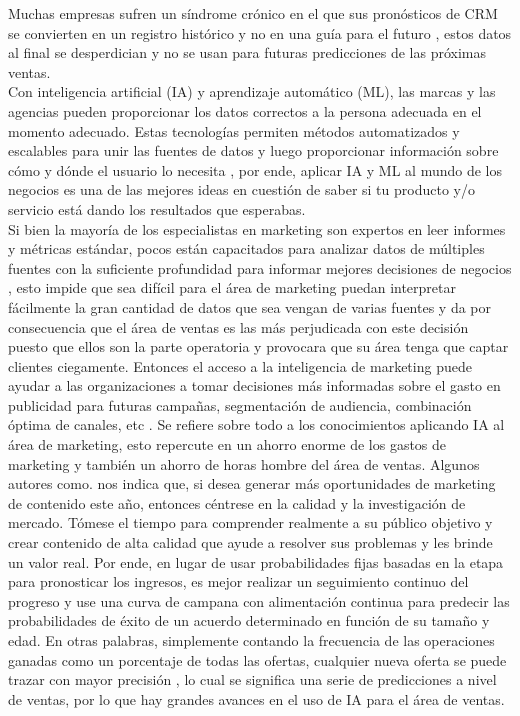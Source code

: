 \documentclass[conference]{IEEEtran}
\begin{document}
Muchas empresas sufren un síndrome crónico en el que sus pronósticos de CRM se convierten en un registro histórico y no en una guía para el futuro \cite{b16}, estos datos al final se desperdician y no se usan para futuras predicciones de las próximas ventas.\\
Con inteligencia artificial (IA) y aprendizaje automático (ML), las marcas y las agencias pueden proporcionar los datos correctos a la persona adecuada en el momento adecuado. Estas tecnologías permiten métodos automatizados y escalables para unir las fuentes de datos y luego proporcionar información sobre cómo y dónde el usuario lo necesita \cite{b17} , por ende, aplicar IA y ML al mundo de los negocios es una de las mejores ideas en cuestión de saber si tu producto y/o servicio está dando los resultados que esperabas.\\
Si bien la mayoría de los especialistas en marketing son expertos en leer informes y métricas estándar, pocos están capacitados para analizar datos de múltiples fuentes con la suficiente profundidad para informar mejores decisiones de negocios \cite{b17} , esto impide que sea difícil para el área de marketing puedan interpretar fácilmente la gran cantidad de datos que sea vengan de varias fuentes y da por consecuencia que el área de ventas es las más perjudicada con este decisión puesto que ellos son la parte operatoria y provocara que su área tenga que captar clientes ciegamente. Entonces el acceso a la inteligencia de marketing puede ayudar a las organizaciones a tomar decisiones más informadas sobre el gasto en publicidad para futuras campañas, segmentación de audiencia, combinación óptima de canales, etc \cite{b17}. Se refiere sobre todo a los conocimientos aplicando IA al área de marketing, esto repercute en un ahorro enorme de los gastos de marketing y también un ahorro de horas hombre del área de ventas. Algunos autores como. \cite{b18} nos indica que, si desea generar más oportunidades de marketing de contenido este año, entonces céntrese en la calidad y la investigación de mercado. Tómese el tiempo para comprender realmente a su público objetivo y crear contenido de alta calidad que ayude a resolver sus problemas y les brinde un valor real. Por ende, en lugar de usar probabilidades fijas basadas en la etapa para pronosticar los ingresos, es mejor realizar un seguimiento continuo del progreso y use una curva de campana con alimentación continua para predecir las probabilidades de éxito de un acuerdo determinado en función de su tamaño y edad. En otras palabras, simplemente contando la frecuencia de las operaciones ganadas como un porcentaje de todas las ofertas, cualquier nueva oferta se puede trazar con mayor precisión \cite{b16}, lo cual se significa una serie de predicciones a nivel de ventas, por lo que hay grandes avances en el uso de IA para el área de ventas.\\
\end{document}
